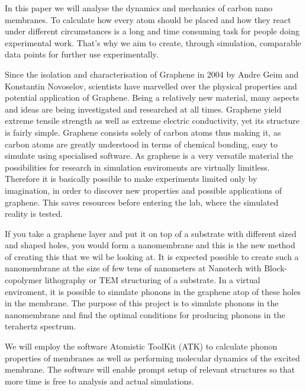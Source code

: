 
In this paper we will analyse the dynamics and mechanics of carbon nano membranes. To calculate how every atom should be placed and how they react under different circumstances is a long and time consuming task for people doing experimental work. That's why we aim to create, through simulation, comparable data points for further use experimentally.

Since the isolation and characterisation of
Graphene in 2004 by Andre Geim and
Konstantin Novoselov, scientists have marvelled over the physical properties and potential
application of Graphene. Being a relatively new material, many aspects and ideas are being
investigated and researched at all times. Graphene yield extreme tensile strength as well as
extreme electric conductivity, yet its structure is fairly simple. Graphene consists solely of
carbon atoms thus making it, as carbon atoms are greatly understood in terms of chemical
bonding, easy to simulate using specialised software. As graphene is a very versatile
material the possibilities for research in simulation enviroments are virtually limitless.
Therefore it is basically possible to make experiments limited only by imagination, in order
to discover new properties and possible applications of graphene. This saves resources
before entering the lab, where the simulated reality is tested.

If you take a graphene layer and put it on top of a substrate with different sized and shaped holes, you would
form a nanomembrane and this is the new method of creating this that we wil be looking at. It is expected possible to create such a nanomembrane at the
size of few tens of nanometers at Nanotech with Block-copolymer lithography or TEM
structuring of a substrate. In a virtual enviroment, it is possible to simulate phonons
in the graphene atop of these holes in the membrane. The purpose of this project is to
simulate phonons in the nanomembrane and find the optimal conditions for producing
phonons in the terahertz spectrum.

We will employ the software Atomistic ToolKit (ATK) to calculate phonon properties
of membranes as well as performing molecular dynamics of the excited membrane. The
software will enable prompt setup of relevant structures so that more time is free to analysis
and actual simulations.
